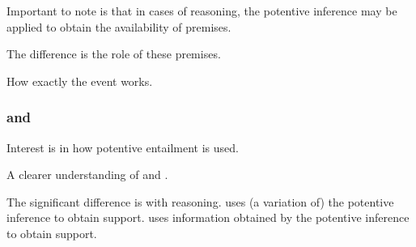 \documentclass[10pt]{article}
\begin{document}
\begin{note}
  Important to note is that in cases of reasoning, the potentive inference may be applied to obtain the availability of premises.

  The difference is the role of these premises.
\end{note}

\begin{note}
  How exactly the event works.
\end{note}

\subsubsection{\AR{} and \WR{}}
\label{sec:ar-wr}

\begin{note}[Overview]
  Interest is in how potentive entailment is used.

  A clearer understanding of \AR{} and \WR{}.

  The significant difference is with reasoning.
  \AR{} uses (a variation of) the potentive inference to obtain support.
  \WR{} uses information obtained by the potentive inference to obtain support.
\end{note}
\end{document}
